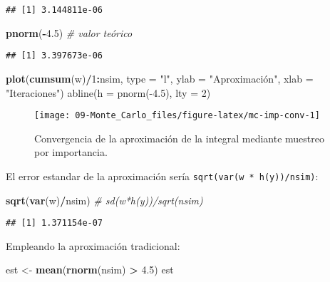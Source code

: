 \documentclass[
]{book}
\newenvironment{Shaded}{\begin{snugshade}}{\end{snugshade}}
\newcommand{\CommentTok}[1]{\textcolor[rgb]{0.56,0.35,0.01}{\textit{#1}}}
\newcommand{\DataTypeTok}[1]{\textcolor[rgb]{0.13,0.29,0.53}{#1}}
\newcommand{\DecValTok}[1]{\textcolor[rgb]{0.00,0.00,0.81}{#1}}
\newcommand{\FloatTok}[1]{\textcolor[rgb]{0.00,0.00,0.81}{#1}}
\newcommand{\KeywordTok}[1]{\textcolor[rgb]{0.13,0.29,0.53}{\textbf{#1}}}
\newcommand{\NormalTok}[1]{#1}
\newcommand{\OperatorTok}[1]{\textcolor[rgb]{0.81,0.36,0.00}{\textbf{#1}}}
\newcommand{\StringTok}[1]{\textcolor[rgb]{0.31,0.60,0.02}{#1}}
\theoremstyle{break}
\theoremstyle{definition}
\theoremstyle{definition}
\theoremstyle{definition}
\theoremstyle{remark}
\begin{document}
\begin{verbatim}
## [1] 3.144811e-06
\end{verbatim}

\begin{Shaded}
\begin{Highlighting}[]
\KeywordTok{pnorm}\NormalTok{(}\OperatorTok{-}\FloatTok{4.5}\NormalTok{)  }\CommentTok{# valor teórico}
\end{Highlighting}
\end{Shaded}

\begin{verbatim}
## [1] 3.397673e-06
\end{verbatim}

\begin{Shaded}
\begin{Highlighting}[]
\KeywordTok{plot}\NormalTok{(}\KeywordTok{cumsum}\NormalTok{(w)}\OperatorTok{/}\DecValTok{1}\OperatorTok{:}\NormalTok{nsim, }\DataTypeTok{type =} \StringTok{"l"}\NormalTok{, }\DataTypeTok{ylab =} \StringTok{"Aproximación", xlab = "}\NormalTok{Iteraciones}\StringTok{")}
\StringTok{abline(h = pnorm(-4.5), lty = 2)}
\end{Highlighting}
\end{Shaded}

\begin{figure}[!htb]

{\centering \texttt{[image: 09-Monte\_Carlo\_files/figure-latex/mc-imp-conv-1]} 

}

\caption{Convergencia de la aproximación de la integral mediante muestreo por importancia.}\label{fig:mc-imp-conv}
\end{figure}

El error estandar de la aproximación sería \texttt{sqrt(var(w\ *\ h(y))/nsim)}:

\begin{Shaded}
\begin{Highlighting}[]
\KeywordTok{sqrt}\NormalTok{(}\KeywordTok{var}\NormalTok{(w)}\OperatorTok{/}\NormalTok{nsim) }\CommentTok{# sd(w*h(y))/sqrt(nsim)   }
\end{Highlighting}
\end{Shaded}

\begin{verbatim}
## [1] 1.371154e-07
\end{verbatim}

Empleando la aproximación tradicional:

\begin{Shaded}
\begin{Highlighting}[]
\NormalTok{est <-}\StringTok{ }\KeywordTok{mean}\NormalTok{(}\KeywordTok{rnorm}\NormalTok{(nsim) }\OperatorTok{>}\StringTok{ }\FloatTok{4.5}\NormalTok{)}
\NormalTok{est}
\end{Highlighting}
\end{Shaded}
\end{document}
